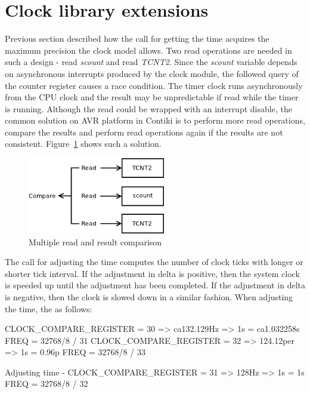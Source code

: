 
\section{Clock library extensions}\label{sec:design-clock}
Previous section described how the call for getting the time acquires
the maximum precision the clock model allows.
Two read operations are needed in such a design - read {\it{scount}} and read {\it{TCNT2}}.
Since the {\it{scount}} variable depends on asynchronous interrupts produced by
the clock module, the followed query of the counter register causes a race condition.
The timer clock runs asynchronously from the CPU clock and
the result may be unpredictable if read while the timer is running.
Although the read could be wrapped with an interrupt disable,
the common solution on AVR platform in Contiki is to perform more read operations,
compare the results and perform read operations again if the results are not consistent.
Figure~\ref{fig:design-read} shows such a solution.

\begin{figure}
  \centering
  \includegraphics[width=6cm,keepaspectratio]{fig/read.png}
  \caption{Multiple read and result comparison}
  \label{fig:design-read}
\end{figure}

The call for adjusting the time computes the number of clock ticks
with longer or shorter tick interval.
If the adjustment in delta is positive, then the system clock is speeded up
until the adjustment has been completed.
If the adjustment in delta is negative, then the clock is slowed down in a similar fashion.
When adjusting the time, the %
as follows:

CLOCK\_COMPARE\_REGISTER = 30 => ca132.129Hz => 1s = ca1.032258s
FREQ = 32768/8 / 31
CLOCK\_COMPARE\_REGISTER = 32 => 124.12per => 1s = 0.96p
FREQ = 32768/8 / 33

Adjusting time - CLOCK\_COMPARE\_REGISTER = 31 => 128Hz => 1s = 1s
FREQ = 32768/8 / 32



